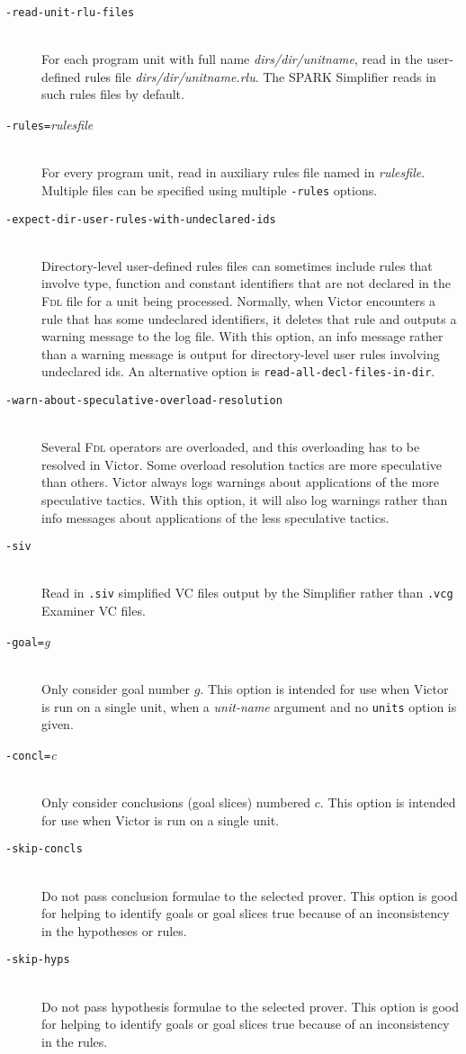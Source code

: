 \documentclass[12pt,fleqn]{article}
\newcommand{\fdl}{\textsc{Fdl}}
\newcommand{\goalreportfile}{\textsc{vct}}
\newcommand{\optionb}[1]{\item[\texttt{-{#1}}]\ \\}
\newcommand{\optionv}[2]{\item[\texttt{-{#1}=}\mdseries\textit{#2}]\ \\}
\begin{document}
\begin{description}
  \optionb{read-unit-rlu-files}
  For each program unit with full name \textit{dirs/dir/unitname},
  read in the user-defined rules file \textit{dirs/dir/unitname.rlu}.  
  The SPARK Simplifier reads in such rules files by default.

  \optionv{rules}{rulesfile} For every program unit, read in
    auxiliary rules file named in \textit{rulesfile}.  Multiple files
    can be specified using multiple \texttt{-rules} options.

  \optionb{expect-dir-user-rules-with-undeclared-ids}
  Directory-level user-defined rules files can sometimes include rules
  that involve type, function and constant identifiers that are not
  declared in the \fdl{} file for a unit being processed.  Normally, when
  Victor encounters a rule that has some undeclared identifiers, it
  deletes that rule and outputs a warning message to the log file.
  With this option, an info message rather than a warning message is
  output for directory-level user rules involving undeclared ids.  An
  alternative option is \texttt{read-all-decl-files-in-dir}.

  \optionb{warn-about-speculative-overload-resolution}
  Several \fdl{} operators are overloaded, and this overloading has to be
  resolved in Victor.  Some overload resolution tactics are more 
  speculative than others. Victor always logs warnings about applications
  of the more speculative tactics. With this option, it will also 
  log warnings rather than info messages about applications of the 
  less speculative tactics.

  \optionb{siv} Read in \texttt{.siv} simplified VC files output by the
     Simplifier rather than \texttt{.vcg} Examiner VC files.

\optionv{goal}{g} Only consider goal number $g$.
  This option is intended for use when Victor is run on a single unit,
  when a \textit{unit-name} argument and no \texttt{units} option is
  given.

\optionv{concl}{c} Only consider conclusions (goal slices) numbered $c$.  
  This option is intended for use when Victor is run on a single unit.

\optionb{skip-concls}
  Do not pass conclusion formulae to the selected prover.  This option is
  good for helping to identify goals or goal slices true because of an
  inconsistency in the hypotheses or rules.

\optionb{skip-hyps}
  Do not pass hypothesis formulae to the selected prover.  This option is
  good for helping to identify goals or goal slices true because of an
  inconsistency in the rules.


\end{description}
\end{document}
